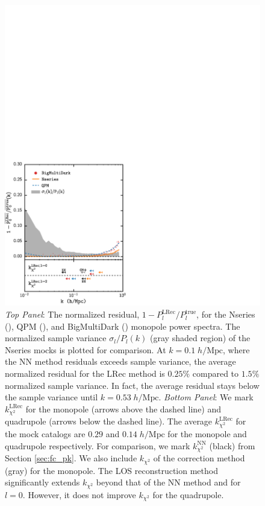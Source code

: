 \begin{figure}
\begin{center}
\includegraphics[width=1.\textwidth]{figs/fc/mock_catalog_dlospeak_true_P0k_norm_resid_rebin6x.pdf} 
\caption{{\it Top Panel}: The normalized residual, 
$1 - P_l^\mathrm{LRec}/P_l^\mathrm{true}$, 
for the Nseries (\nseriescolor), QPM (\qpmcolor), and BigMultiDark (\bmdcolor)
monopole power spectra. The normalized sample variance $\sigma_l / P_l(k)$ 
(gray shaded region) of the Nseries mocks is plotted for comparison. At 
$k = 0.1 \;h/\mathrm{Mpc}$, where the NN method residuals exceeds sample 
variance, the average normalized residual for the LRec method is $0.25\%$ 
compared to $1.5\%$ normalized sample variance. In fact, the average 
residual stays below the sample variance until $k = 0.53\;h/\mathrm{Mpc}$.
{\it Bottom Panel}: We mark $k^\mathrm{LRec}_{\chi^2}$ for the monopole (arrows above the 
dashed line) and quadrupole (arrows below the dashed line). 
The average $k^\mathrm{LRec}_{\chi^2}$ for the mock catalogs
are $0.29$ and $0.14\;h/\mathrm{Mpc}$ for the monopole and quadrupole respectively. 
For comparison, we mark $k^\mathrm{NN}_{\chi^2}$ (black) from Section \ref{sec:fc_pk}. 
We also include $k_{\chi^2}$ of the \cite{Gil-Marin:2014aa} correction method (gray) for 
the monopole. The LOS reconstruction method significantly 
extends $k_{\chi^2}$ beyond that of the NN method and \cite{Gil-Marin:2014aa} for $l=0$. 
However, it does not improve $k_{\chi^2}$ for the quadrupole. 
} 
\label{fig:dlospeak_norm_resid}
\end{center}
\end{figure}

